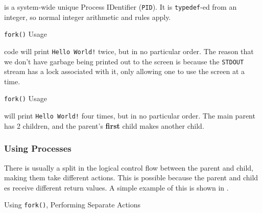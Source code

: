  is a system-wide unique Process IDentifier (\texttt{PID}).
It is \texttt{typedef}-ed from an integer, so normal integer arithmetic and rules apply.

\begin{listing}[h!tbp]
\caption{\texttt{fork()} Usage}
\label{lst:fork_Usage-1}
\end{listing}

 code will print \texttt{Hello World!} twice, but in no particular order.
The reason that we don't have garbage being printed out to the screen is because the \texttt{STDOUT} stream has a lock associated with it, only allowing one  to use the screen at a time.

\begin{listing}[h!tbp]
\caption{\texttt{fork()} Usage}
\label{lst:fork_Usage-2}
\end{listing}

 will print \texttt{Hello World!} four times, but in no particular order.
The main parent  has 2 children, and the parent's \textbf{first} child makes another child.

\subsubsection{Using Processes}\label{subsubsec:Using_Processes}
There is usually a split in the logical control flow between the parent and child, making them take different actions.
This is possible because the parent and child es receive different return values.
A simple example of this is shown in .

\begin{listing}[h!tbp]
\caption{Using \texttt{fork()}, Performing Separate Actions}
\label{lst:Using_fork-1}
\end{listing}

